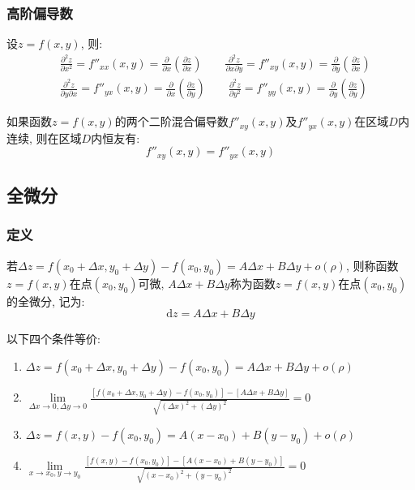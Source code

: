 \subsubsection{高阶偏导数}
设$ z=f(x,y) $, 则:
\begin{equation*}
\begin{aligned}
& \frac{\partial^{2}z}{\partial x^{2}}=f''_{xx}(x,y)=\frac{\partial}{\partial x}(\frac{\partial z}{\partial x})\qquad \frac{\partial^{2}z}{\partial x \partial y}=f''_{xy}(x,y)=\frac{\partial }{\partial y}(\frac{\partial z}{\partial x}) \\
& \frac{\partial^{2}z}{\partial y \partial x}=f''_{yx}(x,y)=\frac{\partial }{\partial x}(\frac{\partial z}{\partial y})\qquad \frac{\partial^{2}z}{\partial y^{2}}=f''_{yy}(x,y)=\frac{\partial }{\partial y}(\frac{\partial z}{\partial y})
\end{aligned}
\end{equation*}\par
如果函数$ z=f(x,y) $的两个二阶混合偏导数$ f''_{xy}(x,y) $及$ f''_{yx}(x,y) $在区域$ D $内连续, 则在区域$ D $内恒友有:
\begin{equation*}
f''_{xy}(x,y)=f''_{yx}(x,y)
\end{equation*}
\subsection{全微分}
\subsubsection{定义}
若$ \Delta z=f(x_{0}+\Delta x,y_{0}+\Delta y)-f(x_{0},y_{0})=A\Delta x+B\Delta y+o(\rho) $, 则称函数$ z=f(x,y) $在点$ (x_{0},y_{0}) $可微, $ A\Delta x+B\Delta y $称为函数$ z=f(x,y) $在点$ (x_{0},y_{0}) $的全微分, 记为:
\begin{equation*}
\mathrm{d}z=A\Delta x+B\Delta y
\end{equation*}
\begin{tcolorbox}
以下四个条件等价:
\begin{enumerate}
\item $ \Delta z=f(x_{0}+\Delta x,y_{0}+\Delta y)-f(x_{0},y_{0})=A\Delta x+B\Delta y+o(\rho) $
\item $ \lim\limits_{\Delta x \rightarrow 0, \Delta y\rightarrow 0}\frac{[f(x_{0}+\Delta x,y_{0}+\Delta y)-f(x_{0},y_{0})]-[A\Delta x+B\Delta y]}{\sqrt{(\Delta x)^{2}+(\Delta y)^{2}}}=0 $
\item $ \Delta z=f(x,y)-f(x_{0},y_{0})=A(x-x_{0})+B(y-y_{0})+o(\rho) $
\item $ \lim\limits_{x \rightarrow x_{0}, y\rightarrow y_{0}}\frac{[f(x,y)-f(x_{0},y_{0})]-[A(x-x_{0})+B(y-y_{0})]}{\sqrt{(x-x_{0})^{2}+(y-y_{0})^{2}}}=0 $
\end{enumerate}
\end{tcolorbox}
